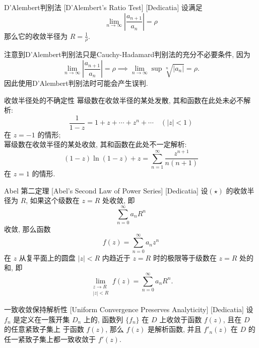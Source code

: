        \begin{thm}
            [DAlembert]
            {D'Alembert判别法}
            [D'Alembert's Ratio Test]
            [Dedicatia]
            设\PowerSeries 满足
            \[\lim_{n\to\infty}\left|\frac{a_{n+1}}{a_n}\right|=\rho\]
            那么它的收敛半径为 \(R=\frac{1}{\rho}\).
        \end{thm}

        \begin{rmk}
            [Dedicatia]
            注意到D'Alembert判别法只是Cauchy-Hadamard判别法的充分不必要条件, 因为
            \[\lim_{n\to\infty}\left|\frac{a_{n+1}}{a_n}\right|=\rho\implies\lim_{n\to\infty}\sup\sqrt[n]{|a_n|}=\rho.\]
            因此使用D'Alembert判别法时可能会产生误判.
        \end{rmk}

        \begin{cxmp}
            {收敛半径处的不确定性}
            幂级数在收敛半径的某处发散, 其和函数在此处未必不解析: 
            \[\frac{1}{1-z}=1+z+\cdots+z^n+\cdots\quad(|z|<1) \]
            在 \(z=-1\) 的情形; \\
            幂级数在收敛半径的某处收敛, 其和函数在此处不一定解析: 
            \[(1-z)\ln(1-z)+z=\sum_{n=1}^{\infty}\frac{z^{n+1}}{n(n+1)}\]
            在 \(z=1\) 的情形. 
        \end{cxmp}

        \begin{thm}
            {Abel 第二定理}
            [Abel's Second Law of Power Series]
            [Dedicatia]
            设\PowerSeries  \((\star)\) 的收敛半径为 \(R\), 如果这个级数在 \(z = R\) 处收敛, 即
            \[\sum_{n=0}^{\infty} a_n R^n\]
            收敛, 那么函数
            \[f(z) = \sum_{n=0}^{\infty} a_n z^n\]
            在 \(z\) 从复平面上的圆盘 \(|z| < R\) 内趋近于 \(z = R\) 时的极限等于级数在 \(z = R\) 处的和, 即
            \[\lim_{\substack{z \to R \\ |z| < R}} f(z) = \sum_{n=0}^{\infty} a_n R^n.\]
        \end{thm}

        \begin{thm}
            {一致收敛保持解析性}
            [Uniform Convergence Preserves Analyticity]
            [Dedicatia]
            设 \(f_n\) 是定义在一簇开集 \(D_n\) 上的\Analytic{}, 函数列 \(\{f_n\}\) 在 \(D\) 上收敛于函数 \(f(z)\), 且在 \(D\) 的任意紧致子集上\UniformConvergent{} 于函数 \(f(z)\), 那么 \(f(z)\) 是解析函数, 并且 \(f'_n(z)\) 在 \(D\) 的任一紧致子集上都一致收敛于 \(f'(z)\).
        \end{thm}

